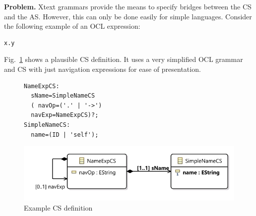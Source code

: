\documentclass{llncs}
\makeatletter
\newenvironment{SubFloat}[2][]%
{\def\sf@one{#1}%
	\def\sf@two{#2}%
	\setbox\sf@box\hbox%
	\bgroup}%
{ \egroup%
	\ifx\@empty\sf@two\@empty\relax%
	\def\sf@two{\@empty}%
	\fi%
	\ifx\@empty\sf@one\@empty\relax%
	\subfloat[\sf@two]{\box\sf@box}%
	\else%
	\subfloat[\sf@one][\sf@two]{\box\sf@box}%
	\fi%
}%
\makeatother
\begin{document}
\textbf{Problem.} Xtext grammars provide the means to specify bridges between the CS and the AS. However, this can only be done easily for simple languages. Consider the following example of an OCL expression: %

\begin{lstlisting}[label=lst:namedExp, language=Xtext]
x.y
\end{lstlisting} 

Fig.~\ref{fig:ExampleCS} shows a plausible CS definition. It uses a very simplified OCL grammar and CS with just navigation expressions for ease of presentation.

\begin{figure}[htbp]
  \captionsetup[subfigure]{labelformat=empty}
  \begin{SubFloat}[]{}%
  	\begin{minipage}{0.35\textwidth}%
    \begin{lstlisting}[label=lst:ExampleGrammar, language=Xtext]
NameExpCS:
  sName=SimpleNameCS 
  ( navOp=('.' | '->')
  navExp=NameExpCS)?;
SimpleNameCS:
  name=(ID | 'self');
    \end{lstlisting} 
    \end{minipage}
  \end{SubFloat}
  \begin{SubFloat}[]{}%
    \begin{minipage}{.60\textwidth}%
	  \includegraphics[width=\textwidth]{images/NameExpCS.pdf}
    \end{minipage}
  \end{SubFloat}
  \caption{Example CS definition}
  \label{fig:ExampleCS}
\end{figure}
\end{document}
